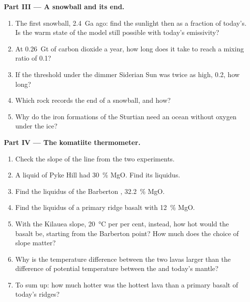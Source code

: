 \begin{problem}
\noindent\textbf{Part III --- A snowball and its end.}
\begin{enumerate}[resume]
  \item The first snowball, \qty{2.4}{Ga} ago: find the sunlight then as a fraction of today's.
        Is the warm state of the model still possible with today's emissivity?
  \item At \qty{0.26}{Gt} of carbon dioxide a year, how long does it take to reach a mixing
        ratio of 0.1?
  \item If the threshold under the dimmer Siderian Sun was twice as high, 0.2, how long?
  \item Which rock records the end of a snowball, and how?
  \item Why do the iron formations of the Sturtian need an ocean without oxygen under the ice?
\end{enumerate}

\noindent\textbf{Part IV --- The komatiite thermometer.}
\begin{enumerate}[resume]
  \item Check the slope of the  line from the two experiments.
  \item A  liquid of Pyke Hill had \qty{30}{\percent} MgO. Find its liquidus.
  \item Find the liquidus of the Barberton , \qty{32.2}{\percent} MgO.
  \item Find the liquidus of a primary ridge basalt with \qty{12}{\percent} MgO.
  \item With the Kilauea slope, \qty{20}{\celsius} per per cent, instead, how hot would the
        basalt be, starting from the Barberton point? How much does the choice of slope matter?
  \item Why is the temperature difference between the two lavas larger than the difference of
        potential temperature between the  and today's mantle?
  \item To sum up: how much hotter was the hottest   lava than a primary basalt
        of today's ridges?
\end{enumerate}
\end{problem}
